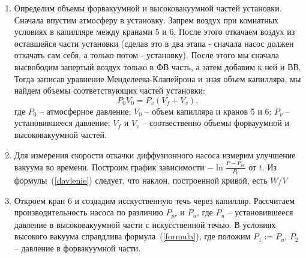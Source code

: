 \documentclass[a4paper,12pt]{article} %
\begin{document}
\begin{enumerate}

	\item
		Определим объемы форвакуумной и высоковакуумной частей установки. Сначала впустим атмосферу в установку. Запрем воздух при комнатных условиях в капилляре между кранами 5 и 6. После этого откачаем воздух из оставшейся части установки (сделав это в два этапа - сначала насос должен откачать сам себя, а только потом - установку). После этого мы сначала высвободим запертый воздух только в ФВ часть, а затем добавим к ней и ВВ. Тогда записав уравнение Менделеева-Клапейрона и зная объем капилляра, мы найдем объемы соответствующих частей установки:
	\begin{equation}
		P_0 V_0 = P_v (V_f + V_v),
	\end{equation}
	где $P_0$ -- атмосферное давление; $V_0$ -- объем капилляра и кранов 5 и 6; $P_v$ -- установившееся давление; $V_f$ и $V_v$ -- соотвественно объемы форвауумной и высоковакуумной частей.
		
	\item
		Для измерения скорости откачки диффузионного насоса измерим улучшение вакуума во времени. Построим график зависимости $-\ln{\frac{P-P_{pr}}{P_0}}$ от $t$. Из формулы~(\ref{davlenie}) следует, что наклон, построенной кривой, есть $W / V$
	
	\item
		Откроем кран 6 и создадим исскуственную течь через капилляр. Рассчитаем производительность насоса по различию $P_{pr}$ и $P_u$, где $P_u$ -- установившееся давление в высоковакуумной части с искусственной течью. В условиях высокого вакуума справдлива формула~(\ref{formula}), где положим $P_1 := P_u$, $P_2$ -- давление в форвакуумной части. 
	
\end{enumerate}


\end{document}
